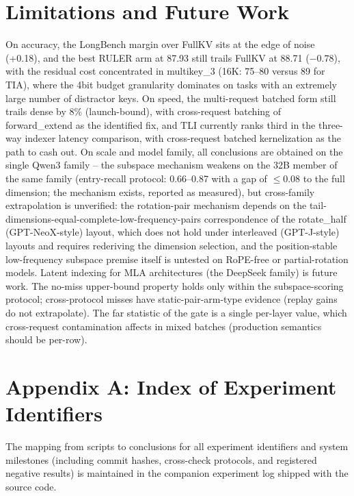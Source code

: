 \documentclass[11pt]{article}
\begin{document}
\section{Limitations and Future Work}

On accuracy, the LongBench margin over FullKV sits at the edge of noise (+0.18), and the best RULER arm at 87.93 still trails FullKV at 88.71 ($-0.78$), with the residual cost concentrated in multikey\_3 (16K: 75--80 versus 89 for TIA), where the 4bit budget granularity dominates on tasks with an extremely large number of distractor keys. On speed, the multi-request batched form still trails dense by 8\% (launch-bound), with cross-request batching of forward\_extend as the identified fix, and TLI currently ranks third in the three-way indexer latency comparison, with cross-request batched kernelization as the path to cash out. On scale and model family, all conclusions are obtained on the single Qwen3 family -- the subspace mechanism weakens on the 32B member of the same family (entry-recall protocol: 0.66--0.87 with a gap of $\le$0.08 to the full dimension; the mechanism exists, reported as measured), but cross-family extrapolation is unverified: the rotation-pair mechanism depends on the tail-dimensions-equal-complete-low-frequency-pairs correspondence of the rotate\_half (GPT-NeoX-style) layout, which does not hold under interleaved (GPT-J-style) layouts and requires rederiving the dimension selection, and the position-stable low-frequency subspace premise itself is untested on RoPE-free or partial-rotation models. Latent indexing for MLA architectures (the DeepSeek family) is future work. The no-miss upper-bound property holds only within the subspace-scoring protocol; cross-protocol misses have static-pair-arm-type evidence (replay gains do not extrapolate). The far statistic of the gate is a single per-layer value, which cross-request contamination affects in mixed batches (production semantics should be per-row).

\section*{Appendix A: Index of Experiment Identifiers}
The mapping from scripts to conclusions for all experiment identifiers and system milestones (including commit hashes, cross-check protocols, and registered negative results) is maintained in the companion experiment log shipped with the source code.
\end{document}
